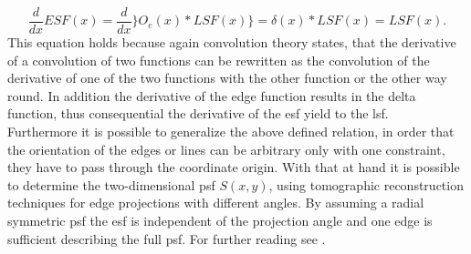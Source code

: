 \begin{equation}
\frac{d}{dx}ESF(x) = \frac{d}{dx}\rbrace O_{e}(x)\ast LSF(x)\rbrace = \delta(x) \ast LSF(x) = LSF(x).
\end{equation}
This equation holds because again convolution theory states, that the derivative of a convolution of two functions can be rewritten as the convolution of the derivative of one of the two functions with the other function or the other way round. In addition the derivative of the edge function results in the delta function, thus consequential the derivative of the \gls{esf} yield to the \gls{lsf}.\\ 

Furthermore it is possible to generalize the above defined relation, in order that the orientation of the edges or lines can be arbitrary only with one constraint, they have to pass through the coordinate origin. With that at hand it is possible to determine the two-dimensional \gls{psf} $S(x,y)$, using tomographic reconstruction techniques for edge projections with different angles. By assuming a radial symmetric \acrlong{psf} the \acrfull{esf} is independent of the projection angle and one edge is sufficient describing the full \gls{psf}. For further reading see \citep{Donath2007}.
